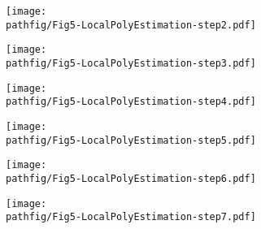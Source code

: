 \documentclass[9pt]{beamer}
\newcommand{\pathfig}{figures}
\begin{document}
\begin{frame}
	\begin{figure}[h]
		\begin{center}
			\texttt{[image: \\pathfig/Fig5-LocalPolyEstimation-step2.pdf]}
		\end{center}
	\end{figure}
\end{frame}

\begin{frame}
	\begin{figure}[h]
		\begin{center}
			\texttt{[image: \\pathfig/Fig5-LocalPolyEstimation-step3.pdf]}
		\end{center}
	\end{figure}
\end{frame}

\begin{frame}
	\begin{figure}[h]
		\begin{center}
			\texttt{[image: \\pathfig/Fig5-LocalPolyEstimation-step4.pdf]}
		\end{center}
	\end{figure}
\end{frame}

\begin{frame}
	\begin{figure}[h]
		\begin{center}
			\texttt{[image: \\pathfig/Fig5-LocalPolyEstimation-step5.pdf]}
		\end{center}
	\end{figure}
\end{frame}

\begin{frame}
	\begin{figure}[h]
		\begin{center}
			\texttt{[image: \\pathfig/Fig5-LocalPolyEstimation-step6.pdf]}
		\end{center}
	\end{figure}
\end{frame}

\begin{frame}
	\begin{figure}[h]
		\begin{center}
			\texttt{[image: \\pathfig/Fig5-LocalPolyEstimation-step7.pdf]}
		\end{center}
	\end{figure}
\end{frame}
\end{document}
